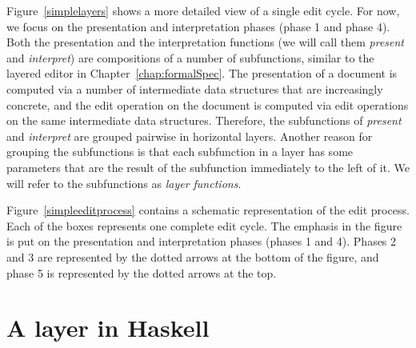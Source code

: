 \bc {}

Figure~\ref{simplelayers}  shows a more detailed view of a single edit cycle. For now, we focus on the presentation and interpretation phases (phase 1 and phase 4). Both the presentation and the interpretation functions (we will call them {\em present} and {\em interpret}) are compositions of a number of subfunctions, similar to the layered editor in Chapter~\ref{chap:formalSpec}. The presentation of a document is computed via a number of intermediate data structures that are increasingly concrete, and the edit operation on the document is computed via edit operations on the same intermediate data structures. Therefore, the subfunctions of {\em present} and {\em interpret} are grouped pairwise in horizontal layers. Another reason for grouping the subfunctions is that each subfunction in a layer has some parameters that are the result of the subfunction immediately to the left of it. We will refer to the subfunctions as {\em layer functions}. \ec


% 



\bc
Figure~\ref{simpleeditprocess} contains a schematic representation of the edit process. Each of the boxes represents one complete edit cycle. The emphasis in the figure is put on the presentation and interpretation phases (phases 1 and 4). Phases 2 and 3 are represented by the dotted arrows at the bottom of the figure, and phase 5 is represented by the dotted arrows at the top.
\ec



%																
%																
%																
\section{A layer in Haskell} \label{sect:layerInHaskell}

